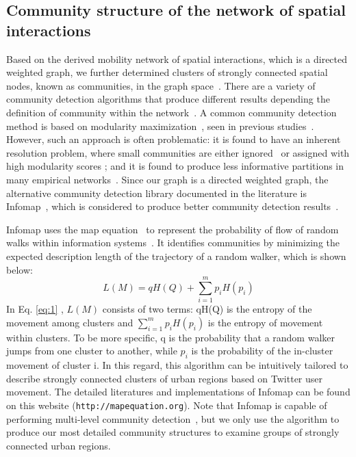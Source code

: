 \documentclass[]{tGIS2e}
\begin{document}
\subsection{Community structure of the network of spatial interactions}
Based on the derived mobility network of spatial interactions, which is a directed weighted graph, we further determined clusters of strongly connected spatial nodes, known as communities, in the graph space~\citep{coscia2011}. 
There are a variety of community detection algorithms that produce different results depending the definition of community within the network~\citep{coscia2011}.
A common community detection method is based on modularity maximization~\citep{newman2006}, seen in previous studies~\citep{hawelka,ratti2010,song2012}.
However, such an approach is often problematic: it is found to have an inherent resolution problem, where small communities are either ignored~\citep{fortunato2007} or assigned with high modularity scores \citep{guimera2004}; and it is found to produce less informative partitions in many empirical networks~\citep{good2010}.
Since our graph is a directed weighted graph, the alternative community detection library documented in the literature is Infomap~\citep{domenico2015,rosvall2008}, which is considered to produce better community detection results~\citep{lancichinetti2009}.

Infomap uses the map equation~\citep{rosvall2010} to represent the probability of flow of random walks within information systems~\citep{rosvall2008}.
It identifies communities by minimizing the expected description length of the trajectory of a random walker, which is shown below:
\begin{equation} \label{eq:1}
L(M)=qH(Q) + \sum_{i=1}^{m} p_{i}H(p_{i})
\end{equation}
In Eq. \eqref{eq:1} , $L(M)$ consists of two terms: qH(Q) is the entropy of the movement among clusters and $ \sum_{i=1}^{m} p_{i}H(p_{i})$ is the entropy of movement within clusters. 
To be more specific, q is the probability that a random walker jumps from one cluster to another, while $p_i$ is the probability of the in-cluster movement of cluster i.
In this regard, this algorithm can be intuitively tailored to describe strongly connected clusters of urban regions based on Twitter user movement.
The detailed literatures and implementations of Infomap can be found on this website ({\tt{http://mapequation.org}}).
Note that Infomap is capable of performing multi-level community detection~\citep{domenico2015}, but we only use the algorithm to produce our most detailed community structures
to examine groups of strongly connected urban regions.
\end{document}
